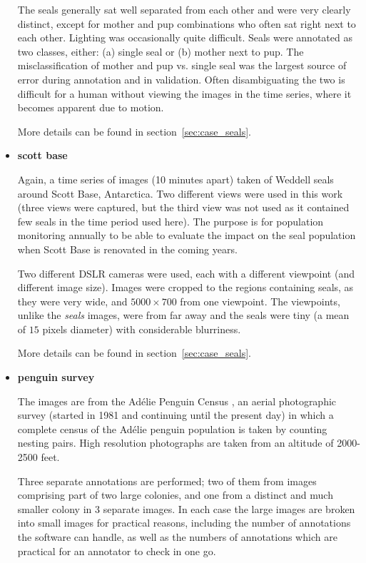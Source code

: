 \begin{itemize}
The seals generally sat well separated from each other and were very clearly distinct, except for mother and pup combinations who often sat right next to each other. Lighting was occasionally quite difficult. Seals were annotated as two classes, either: (a) single seal or (b) mother next to pup.  The misclassification of mother and pup vs. single seal was the largest source of error during annotation and in validation. Often disambiguating the two is difficult for a human without viewing the images in the time series, where it becomes apparent due to motion.

More details can be found in section~\ref{sec:case_seals}.

    \item{\bf{scott base}}
    
Again, a time series of images (10 minutes apart) taken of Weddell seals around Scott Base, Antarctica. Two different views were used in this work (three views were captured, but the third view was not used as it contained few seals in the time period used here). The purpose is for population monitoring annually to be able to evaluate the impact on the seal population when Scott Base is renovated in the coming years. 

Two different DSLR cameras were used, each with a different viewpoint (and different image size). Images were cropped to the regions containing seals, as they were very wide, and $5000\times700$ from one viewpoint. The viewpoints, unlike the \emph{seals} images, were from far away and the seals were tiny (a mean of $15$ pixels diameter) with considerable blurriness.  
    
More details can be found in section~\ref{sec:case_seals}.
    
    \item{\bf{penguin survey}}
    
The images are from the Ad\'elie Penguin Census \cite{Lyver2014}, an aerial photographic survey (started in 1981 and continuing until the present day) in which a complete census of the Ad\'elie penguin population is taken by counting nesting pairs. High resolution photographs are taken from an altitude of 2000-2500 feet.

Three separate annotations are performed; two of them from images comprising part of two large colonies, and one from a distinct and much smaller colony in 3 separate images. In each case the large images are broken into small images for practical reasons, including the number of annotations the software can handle, as well as the numbers of annotations which are  practical for an annotator to check in one go.
    

\end{itemize}
